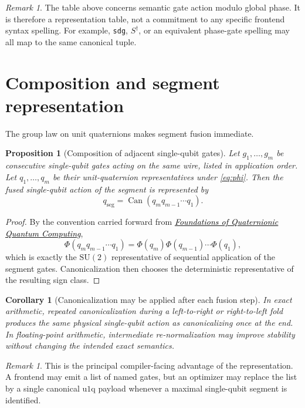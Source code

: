 \documentclass[11pt]{article}
\newtheorem{proposition}[definition]{Proposition}
\newtheorem{corollary}[definition]{Corollary}
\theoremstyle{remark}
\newtheorem{remark}[definition]{Remark}
\newcommand{\SU}{\mathrm{SU}}
\newcommand{\canon}{\operatorname{Can}}
\newcommand{\uoneq}{\mathrm{u1q}}
\newcommand{\foundationstitle}{\href{../qqc-001-foundations/paper.pdf}{\textcolor{black}{\emph{Foundations of Quaternionic Quantum Computing}}}}
\begin{document}
\begin{remark}
The table above concerns semantic gate action modulo global phase. It is
therefore a representation table, not a commitment to any specific frontend
syntax spelling. For example, \texttt{sdg}, $S^\dagger$, or an equivalent
phase-gate spelling may all map to the same canonical tuple.
\end{remark}

\section{Composition and segment representation}

The group law on unit quaternions makes segment fusion immediate.

\begin{proposition}[Composition of adjacent single-qubit gates]
Let $g_1,\dots,g_m$ be consecutive single-qubit gates acting on the same wire,
listed in application order. Let $q_1,\dots,q_m$ be their unit-quaternion
representatives under \eqref{eq:phi}. Then the fused single-qubit action of
the segment is represented by
\[
q_{\mathrm{seg}}=\canon(q_m q_{m-1}\cdots q_1).
\]
\end{proposition}

\begin{proof}
By the convention carried forward from \foundationstitle,
\[
\Phi(q_m q_{m-1}\cdots q_1)
=
\Phi(q_m)\Phi(q_{m-1})\cdots\Phi(q_1),
\]
which is exactly the $\SU(2)$ representative of sequential application of the
segment gates. Canonicalization then chooses the deterministic representative of
the resulting sign class.
\end{proof}

\begin{corollary}[Canonicalization may be applied after each fusion step]
In exact arithmetic, repeated canonicalization during a left-to-right or
right-to-left fold produces the same physical single-qubit action as
canonicalizing once at the end. In floating-point arithmetic, intermediate
re-normalization may improve stability without changing the intended exact
semantics.
\end{corollary}

\begin{remark}
This is the principal compiler-facing advantage of the representation. A
frontend may emit a list of named gates, but an optimizer may replace the list
by a single canonical $\uoneq$ payload whenever a maximal single-qubit segment
is identified.
\end{remark}
\end{document}
